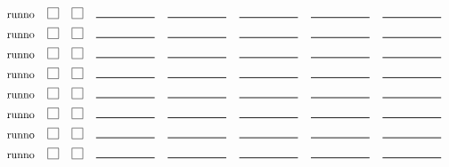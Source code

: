 \documentclass[12pt]{article}
\newcommand{\cbox}{\raisebox{.6ex}{\fbox{\rule{0in}{0.05in}\rule{0.05in}{0in}}}}
\newcommand{\eline}{\rule{0.75in}{0.01in}}
\begin{document}
$$\begin{tabular}{lcccccccc}
runno & \cbox & \cbox & \eline & \eline & \eline & \eline & \eline \\[0.075in]
runno & \cbox & \cbox & \eline & \eline & \eline & \eline & \eline \\[0.075in]
runno & \cbox & \cbox & \eline & \eline & \eline & \eline & \eline \\[0.075in]
runno & \cbox & \cbox & \eline & \eline & \eline & \eline & \eline \\[0.075in]
runno & \cbox & \cbox & \eline & \eline & \eline & \eline & \eline \\[0.075in]
runno & \cbox & \cbox & \eline & \eline & \eline & \eline & \eline \\[0.075in]
runno & \cbox & \cbox & \eline & \eline & \eline & \eline & \eline \\[0.075in]
runno & \cbox & \cbox & \eline & \eline & \eline & \eline & \eline \\[0.075in]

\end{tabular}
$$
\end{document}
